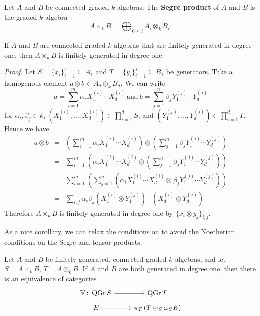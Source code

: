 \begin{definition}\label{def: segre product}
  Let \(A\) and \(B\) be connected graded \(k\)-algebras.
  The \textbf{Segre product} of \(A\) and \(B\) is the graded \(k\)-algebra
  \[ A \times_k B = \bigoplus_{0 \leq i} A_i \otimes_k B_i.\]
\end{definition}

\begin{proposition}\label{proposition: segre product of generated in degree 1 is generated in degree 1}
  If \(A\) and \(B\) are connected graded \(k\)-algebras that are finitely generated in degree one, then \(A \times_k B\) is finitely generated in degree one.
\end{proposition}

\begin{proof}
  Let \(S = \{x_i\}_{i = 1}^r \subseteq A_1\) and \(T = \{y_i\}_{i = 1}^s \subseteq B_1\) be generators.
  Take a homogenous element \(a \otimes b \in A_d \otimes_k B_d\).
  We can write
  \[a = \sum_{i = 1}^m \alpha_i X_1^{(i)} \cdots X_d^{(i)}\ \text{and}\ b = \sum_{j = 1}^n \beta_j Y_1^{(j)} \cdots Y_d^{(j)}\]
  for \(\alpha_i,\beta_j \in k\), \((X_1^{(i)}, \ldots, X_d^{(i)}) \in \prod_{i = 1}^d S\), and \((Y_1^{(j)}, \ldots, Y_d^{(j)}) \in \prod_{i = 1}^d T\).
  Hence we have
  \begin{eqnarray*}
    a \otimes b &=& \left(\sum_{i=1}^m \alpha_i X_1^{(i)} \cdots X_d^{(i)}\right) \otimes \left(\sum_{j = 1}^n \beta_j Y_1^{(j)} \cdots Y_d^{(j)}\right)\\
    &=& \sum_{i = 1}^m\left(\alpha_i X_1^{(i)} \cdots X_d^{(i)} \otimes \left(\sum_{j = 1}^n \beta_j Y_1^{(j)} \cdots Y_d^{(j)}\right)\right)\\
    &=& \sum_{i = 1}^m\left(\sum_{j = 1}^n\left(\alpha_i  X_1^{(i)} \cdots X_d^{(i)} \otimes \beta_j Y_1^{(j)} \cdots Y_d^{(j)}\right)\right)\\
    &=& \sum_{i,j} \alpha_i\beta_j (X_1^{(i)} \otimes Y_1^{(j)}) \cdots (X_d^{(i)} \otimes Y_d^{(j)})
  \end{eqnarray*}
    Therefore \(A \times_k B\) is finitely generated in degree one by \(\{x_i \otimes y_j\}_{i,j}\).
\end{proof}

As a nice corollary, we can relax the conditions on \textcite[Theorem 2.4]{VR96} to avoid the Noetherian conditions on the Segre and tensor products.

\begin{theorem}[{\textcite[Theorem 2.4]{VR96}}]\label{theorem: Van Rompay}
    Let \(A\) and \(B\) be finitely generated, connected graded \(k\)-algebras, and let \(S = A \times_k B\), \(T = A \otimes_k B\).
    If \(A\) and \(B\) are both generated in degree one, then there is an equivalence of categories
    \[\begin{tikzcd}[row sep=tiny]
    \mathbb{V} \colon \QGr{S} \arrow{r} & \QGr{T}\\
    E \arrow[mapsto]{r} & \pi_{T}\left(T \otimes_S \omega_{S}E\right)
    \end{tikzcd}\]
\end{theorem}

